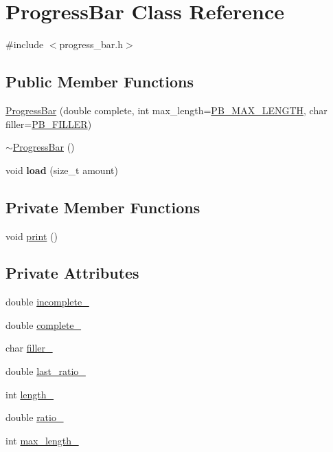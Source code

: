 \hypertarget{classProgressBar}{}\section{Progress\+Bar Class Reference}
\label{classProgressBar}


{\ttfamily \#include $<$progress\+\_\+bar.\+h$>$}

\subsection*{Public Member Functions}
\begin{DoxyCompactItemize}
\item 
\hyperlink{classProgressBar_a38a5ddb0f36f71215ab1580195f1985e}{Progress\+Bar} (double complete, int max\+\_\+length=\hyperlink{progress__bar_8h_a18479b931ce473b3e2c104b8d6e76222}{P\+B\+\_\+\+M\+A\+X\+\_\+\+L\+E\+N\+G\+T\+H}, char filler=\hyperlink{progress__bar_8h_afe68959dcbb6a75980f1f3f436fd0e20}{P\+B\+\_\+\+F\+I\+L\+L\+E\+R})
\item 
\hyperlink{classProgressBar_aa0ced60c0ade467a4602c35443e7bc78}{$\sim$\+Progress\+Bar} ()
\item 
\hypertarget{classProgressBar_a6490c1cb7eaba05fbe661c6727e99e5c}{}void {\bfseries load} (size\+\_\+t amount)\label{classProgressBar_a6490c1cb7eaba05fbe661c6727e99e5c}

\end{DoxyCompactItemize}
\subsection*{Private Member Functions}
\begin{DoxyCompactItemize}
\item 
void \hyperlink{classProgressBar_a3dcedc2aef170c30b155e16ef9978f1a}{print} ()
\end{DoxyCompactItemize}
\subsection*{Private Attributes}
\begin{DoxyCompactItemize}
\item 
double \hyperlink{classProgressBar_a467e3f119859dbd02d0c112754f64584}{incomplete\+\_\+}
\item 
double \hyperlink{classProgressBar_a97dbedb8fd9600ba38e5d113d84289b4}{complete\+\_\+}
\item 
char \hyperlink{classProgressBar_a35640d6a683ca685afdbe40b8cb2a24c}{filler\+\_\+}
\item 
double \hyperlink{classProgressBar_a8a8f9d73ac47931be9e2c3840af0d084}{last\+\_\+ratio\+\_\+}
\item 
int \hyperlink{classProgressBar_ad35a128decfee0e0283388a2364af2b9}{length\+\_\+}
\item 
double \hyperlink{classProgressBar_a1559657830813de8c347cdbb13026faf}{ratio\+\_\+}
\item 
int \hyperlink{classProgressBar_a6d1fb65b7330c5c997aecf6db9b6b612}{max\+\_\+length\+\_\+}
\end{DoxyCompactItemize}


